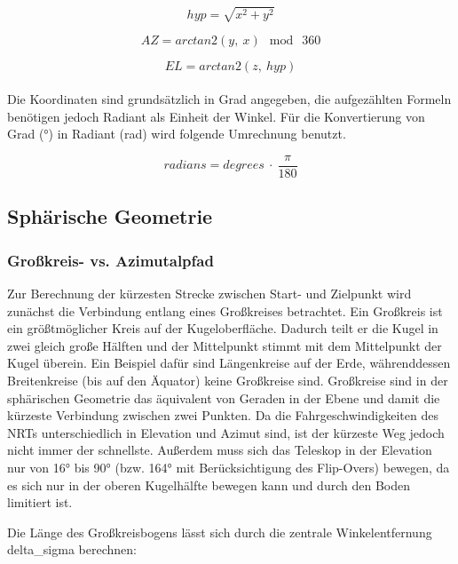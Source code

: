 \begin{equation}
    hyp = \sqrt{x^2 + y^2}
    \label{hypotenuse}
\end{equation}

\begin{equation}
    AZ = arctan2(y,~x)~ \bmod ~360
    \label{arctan2_az}
\end{equation}

\begin{equation}
    EL = arctan2(z,~hyp)
    \label{arctan2_el}
\end{equation}
\\
Die Koordinaten sind grundsätzlich in Grad angegeben, die aufgezählten Formeln benötigen jedoch Radiant als Einheit der Winkel.
Für die Konvertierung von Grad (°) in Radiant (rad) wird folgende Umrechnung benutzt.

\begin{equation}
    radians = degrees ~\cdot~ \frac{\pi}{180}
    \label{degree to radians}
\end{equation}


\subsection{Sphärische Geometrie}

\subsubsection{Großkreis- vs. Azimutalpfad}

Zur Berechnung der kürzesten Strecke zwischen Start- und Zielpunkt wird zunächst die Verbindung entlang eines Großkreises betrachtet. Ein Großkreis ist ein größtmöglicher Kreis auf der Kugeloberfläche. Dadurch teilt er die Kugel in zwei gleich große Hälften und der Mittelpunkt stimmt mit dem Mittelpunkt der Kugel überein. Ein Beispiel dafür sind Längenkreise auf der Erde, währenddessen Breitenkreise (bis auf den Äquator) keine Großkreise sind. Großkreise sind in der sphärischen Geometrie das äquivalent von Geraden in der Ebene und damit die kürzeste Verbindung zwischen zwei Punkten.
Da die Fahrgeschwindigkeiten des NRTs unterschiedlich in Elevation und Azimut sind, ist der kürzeste Weg jedoch nicht immer der schnellste. Außerdem muss sich das Teleskop in der Elevation nur von 16° bis 90° (bzw. 164° mit Berücksichtigung des Flip-Overs) bewegen, da es sich nur in der oberen Kugelhälfte bewegen kann und durch den Boden limitiert ist.

Die Länge des Großkreisbogens lässt sich durch die zentrale Winkelentfernung delta_sigma berechnen:

